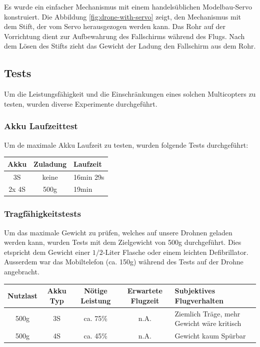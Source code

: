 Es wurde ein einfacher Mechanismus mit einem handelsüblichen Modelbau-Servo konstruiert. Die Abbildung \ref{fig:drone-with-servo} zeigt, den Mechanismus mit dem Stift, der vom Servo herausgezogen werden kann. Das Rohr auf der Vorrichtung dient zur Aufbewahrung des Fallschirms während des Flugs. Nach dem Lösen des Stifts zieht das Gewicht der Ladung den Fallschirm aus dem Rohr.\\

\subsection{Tests}
Um die Leistungsfähigkeit und die Einschränkungen eines solchen Multicopters zu testen, wurden diverse Experimente durchgeführt.

\subsubsection{Akku Laufzeittest}
Um de maximale Akku Laufzeit zu testen, wurden folgende Tests durchgeführt: \\

\begin{tabularx}{\textwidth}{|c|c|X|}
	\hline
	\textbf{Akku} & \textbf{Zuladung} & \textbf{Laufzeit} \\ \hline \hline
	3S & keine & 16min 29s\\ \hline
	2x 4S & 500g & 19min\\ \hline
\end{tabularx}

\subsubsection{Tragfähigkeitstests}
\label{sec:drone-gewichttest}

Um das maximale Gewicht zu prüfen, welches auf unsere Drohnen geladen werden kann, wurden Tests mit dem Zielgewicht von 500g durchgeführt. Dies etspricht dem Gewicht einer $1/2$-Liter Flasche oder einem leichten Defibrillator. Ausserdem war das Mobiltelefon (ca. 150g) während des Tests auf der Drohne angebracht.  \\

\begin{tabularx}{\textwidth}{|c|c|c|c|X|}
	\hline
	\textbf{Nutzlast} & \textbf{Akku Typ} & \textbf{Nötige Leistung }& \textbf{Erwartete Flugzeit } & \textbf{Subjektives Flugverhalten }\\
	\hline \hline
	500g & 3S & ca. 75\%  & n.A. & Ziemlich Träge, mehr Gewicht wäre kritisch\\\hline
	500g & 4S & ca. 45\%  & n.A. & Gewicht kaum Spürbar\\
	\hline
\end{tabularx}\\

